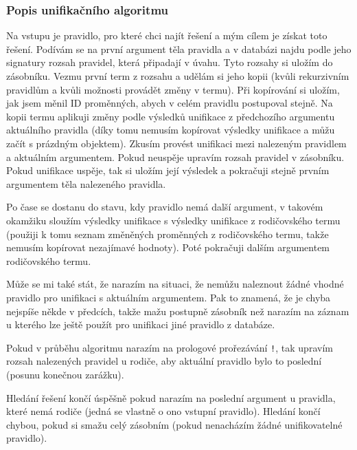 \documentclass[12pt,a4paper,titlepage]{scrartcl}
\begin{document}
	\subsubsection{Popis unifikačního algoritmu}
	Na vstupu je pravidlo, pro které chci najít řešení a mým cílem je získat toto řešení. Podívám se na první argument těla pravidla a v databázi najdu podle jeho signatury rozsah pravidel, která připadají v úvahu. Tyto rozsahy si uložím do zásobníku. Vezmu první term z rozsahu a udělám si jeho kopii (kvůli rekurzivním pravidlům a kvůli možnosti provádět změny v termu). Při kopírování si uložím, jak jsem měnil ID proměnných, abych v celém pravidlu postupoval stejně. Na kopii termu aplikuji změny podle výsledků unifikace z předchozího argumentu aktuálního pravidla (díky tomu nemusím kopírovat výsledky unifikace a můžu začít s prázdným objektem). Zkusím provést unifikaci mezi nalezeným pravidlem a aktuálním argumentem. Pokud neuspěje upravím rozsah pravidel v zásobníku. Pokud unifikace uspěje, tak si uložím její výsledek a pokračuji stejně prvním argumentem těla nalezeného pravidla.
	\par
	Po čase se dostanu do stavu, kdy pravidlo nemá další argument, v takovém okamžiku sloužím výsledky unifikace s výsledky unifikace z rodičovského termu (použiji k tomu seznam změněných proměnných z rodičovského termu, takže nemusím kopírovat nezajímavé hodnoty). Poté pokračuji dalším argumentem rodičovského termu.
	\par
	Může se mi také stát, že narazím na situaci, že nemůžu naleznout žádné vhodné pravidlo pro unifikaci s aktuálním argumentem. Pak to znamená, že je chyba nejspíše někde v předcích, takže mažu postupně zásobník než narazím na záznam u kterého lze ještě použít pro unifikaci jiné pravidlo z databáze.
	\par
	Pokud v průběhu algoritmu narazím na prologové prořezávání \texttt{!}, tak upravím rozsah nalezených pravidel u rodiče, aby aktuální pravidlo bylo to poslední (posunu konečnou zarážku).
	\par
	Hledání řešení končí úspěšně pokud narazím na poslední argument u pravidla, které nemá rodiče (jedná se vlastně o ono vstupní pravidlo). Hledání končí chybou, pokud si smažu celý zásobním (pokud nenacházím žádné unifikovatelné pravidlo).
	
\end{document}
